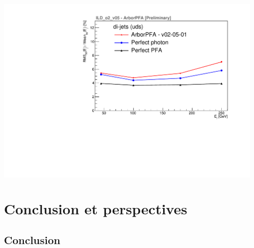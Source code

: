 \documentclass[8pt]{beamer}
\begin{document}
\begin{frame}
\begin{minipage}{0.49\linewidth}
\begin{center}
        \includegraphics[width=\linewidth]{ILDArborPFA_EResol_NoNeutralHadron.pdf}
      \end{center}
    \end{minipage}
  \end{frame}





























  \section{Conclusion et perspectives}

  \begin{frame}
  \frametitle{\secname}
    \tableofcontents[currentsection]
  \end{frame}

  \subsection*{Conclusion}
\end{document}
